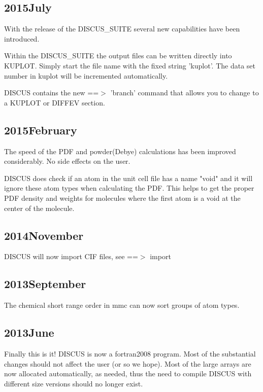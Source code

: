 \subsection*{2015July}
\par
With the release of the DISCUS\_SUITE several new capabilities have 
been introduced. 
\par
Within the DISCUS\_SUITE the output files can be written directly into 
KUPLOT. Simply start the file name with the fixed string 'kuplot'. 
The data set number in kuplot will be incremented automatically. 
\par
DISCUS contains the new ==$> $ 'branch' command that allows you to 
change to a KUPLOT or DIFFEV section. 
\subsection*{2015February}
\par
The speed of the PDF and powder(Debye) calculations has been improved 
considerably. No side effects on the user. 
\par
DISCUS does check if an atom in the unit cell file has a name "void" 
and it will ignore these atom types when calculating the PDF. 
This helps to get the proper PDF density and weights for molecules 
where the first atom is a void at the center of the molecule. 
\subsection*{2014November}
\par
DISCUS will now import CIF files, see ==$> $ import 
\par
\subsection*{2013September}
\par
The chemical short range order in mmc can now sort groups of 
atom types. 
\par
\subsection*{2013June}
\par
Finally this is it! DISCUS is now a fortran2008 program. Most of the 
substantial changes should not affect the user (or so we hope). 
Most of the large arrays are now allocated automatically, as needed, 
thus the need to compile DISCUS with different size versions should 
no longer exist. 
\par
